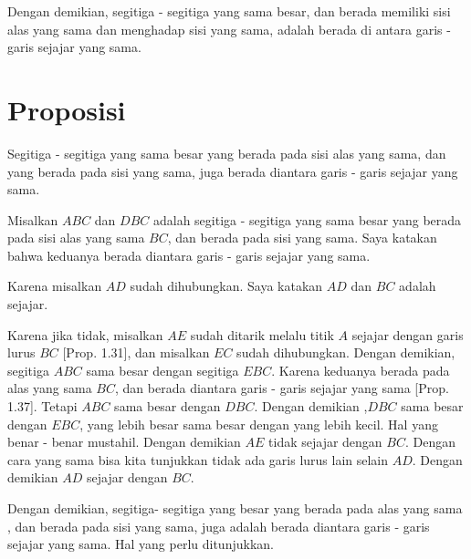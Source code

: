 \documentclass[a4paper]{book}
\begin{document}
Dengan demikian, segitiga - segitiga yang sama besar, dan berada memiliki 
sisi alas yang sama
dan menghadap sisi yang sama, adalah berada di antara garis - garis sejajar 
yang sama.

\section*{\centering Proposisi \thesection} 
Segitiga - segitiga yang sama besar yang berada pada sisi alas yang sama,
dan yang berada pada sisi yang sama, juga berada diantara garis - garis sejajar
yang sama.
\begin{center}
\end{center}
Misalkan $ABC$ dan $DBC$ adalah segitiga - segitiga yang sama besar yang berada 
pada sisi alas yang sama $BC$, dan berada pada sisi yang sama. Saya katakan 
bahwa keduanya berada diantara garis - garis sejajar yang sama.

Karena misalkan $AD$ sudah dihubungkan. Saya katakan $AD$ dan $BC$ adalah 
sejajar.

Karena jika tidak, misalkan $AE$ sudah ditarik melalu titik $A$ sejajar dengan 
garis lurus $BC$ [Prop. 1.31], dan misalkan $EC$ sudah dihubungkan. Dengan 
demikian, segitiga $ABC$ sama besar dengan segitiga $EBC$. Karena keduanya
berada pada alas yang sama $BC$, dan berada diantara garis - garis sejajar
yang sama [Prop. 1.37]. Tetapi $ABC$ sama besar dengan $DBC$. Dengan demikian
,$DBC$ sama besar dengan $EBC$, yang lebih besar sama besar dengan yang lebih
kecil. Hal yang benar - benar mustahil. Dengan demikian $AE$ tidak sejajar 
dengan  $BC$. Dengan cara yang sama bisa kita tunjukkan tidak ada garis lurus
lain selain $AD$. Dengan demikian $AD$ sejajar dengan $BC$.

Dengan demikian, segitiga- segitiga yang besar yang berada pada alas yang sama , 
dan berada pada sisi yang sama, juga adalah berada diantara garis - garis sejajar
yang sama. Hal yang perlu ditunjukkan.
\end{document}
